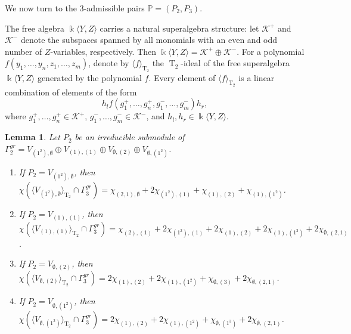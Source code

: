 \documentclass{amsart}
\newtheorem{lem}[thm]{Lemma}
\theoremstyle{definition}
\theoremstyle{remark}
\numberwithin{equation}{section}
\newcommand{\lr}[1]{\langle #1 \rangle}
\def \Ga{\Gamma}
\def \k{\Bbbk}
\def \P{\mathbb{P}}
\def \K{\mathcal{K}}
\def \T{\operatorname{T}}
\def \es{\emptyset}
\begin{document}
	We now turn to the $3$-admissible pairs $\P = (P_2, P_3)$.
	
	The free algebra $\k \lr{Y,Z}$ carries a natural superalgebra structure: let $\K^+$ and $\K^-$ denote the subspaces spanned by all monomials with an even and odd number of $Z$-variables, respectively. Then $\k\lr{Y,Z} = \K^+ \oplus \K^-$. For a polynomial $f(y_1, \dots, y_n, z_1, \dots, z_m)$, denote by $\lr{f}_{\T_2}$ the $\T_2$-ideal of the free superalgebra $\k\lr{Y,Z}$ generated by the polynomial $f$. Every element of $\lr{f}_{\T_2}$ is a linear combination of elements of the form
	\[
	h_l f(g_1^+, \dots, g_n^+, g_1^-, \dots, g_m^-) h_r,
	\]
	where $g_1^+, \dots, g_n^+ \in \K^+$, $g_1^-, \dots, g_m^- \in \K^-$, and $h_l, h_r \in \k\lr{Y,Z}$.
	
\begin{lem}\label{lem2.7}
	Let $P_2$ be an irreducible submodule of $\Ga_2^{gr} = V_{(1^2), \es} \oplus  V_{(1),(1)} \oplus V_{\es,(2)} \oplus V_{\es,(1^2)}$.
	\begin{enumerate}
		\item[(1)]
		If $P_2=V_{(1^2), \es}$, then $\chi({\lr{V_{(1^2), \es}}_{\T_2} \cap \Ga_3^{gr}}) = \chi_{(2,1),\es} + 2\chi_{(1^2),(1)} + \chi_{(1),(2)} + \chi_{(1),(1^2)}$.
		\item[(2)]
		If $P_2=V_{(1), (1)}$, then $\chi({\lr{V_{(1), (1)}}_{\T_2} \cap \Ga_3^{gr}}) = \chi_{(2),(1)} + 2\chi_{(1^2),(1)} + 2\chi_{(1),(2)} + 2\chi_{(1),(1^2)} + 2\chi_{\es, (2,1)}$.
		\item[(3)]
		If $P_2=V_{\es, (2)}$, then $\chi({\lr{V_{\es, (2)}}_{\T_2} \cap \Ga_3^{gr}}) =2\chi_{(1),(2)} + 2\chi_{(1),(1^2)} + \chi_{\es, (3)} + 2\chi_{\es, (2,1)}$.
		\item[(4)]
		If $P_2=V_{\es, (1^2)}$, then $\chi({\lr{V_{\es, (1^2)}}_{\T_2} \cap \Ga_3^{gr}}) =2\chi_{(1),(2)} + 2\chi_{(1),(1^2)} + \chi_{\es, (1^3)} + 2\chi_{\es, (2,1)}$.
	\end{enumerate}
\end{lem}	
	
\end{document}
